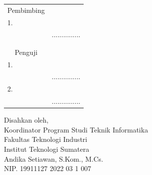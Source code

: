 \begin{center}
	\justify
	\setlength{\tabcolsep}{0pt}
	\begin{tabular}{ m{0.5cm}  m{} >{\centering\arraybackslash}m{}}
		\multicolumn{2}{c}{\hspace*{70pt}Pembimbing} & \multicolumn{1}{c}{}                   \\[2pt]
		1.                                           & \printnamadosbinga   &                 \\
		                                             & \printnipdosbinga    & ............... \\%
		                                             &                                        \\
		                                             &                                        \\
		\multicolumn{2}{c}{\hspace*{70pt}Penguji}     & \multicolumn{1}{c}{}                   \\[2pt]
		1.                                           & \printnamapengujia   &                 \\
		                                             & \printnippengujia    & ............... \\[4pt]
		2.                                           & \printnamapengujib   &                 \\
		                                             & \printnippengujib    & ............... \\
	\end{tabular}

	\begin{center}
		\fontsize{10pt}{10pt}
		\vspace{0.45cm}
		Disahkan oleh,\\
		Koordinator Program Studi Teknik Informatika\\
		Fakultas Teknologi Industri\\
		Institut Teknologi Sumatera
		\vspace{1.8cm}\\
		Andika Setiawan, S.Kom., M.Cs. \\ %
		NIP. 19911127 2022 03 1 007 \\
	\end{center}
	\vfill

\end{center}
\clearpage
